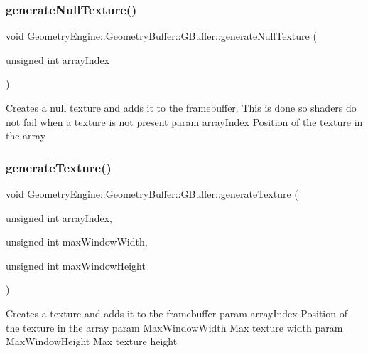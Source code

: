 \subsubsection{\texorpdfstring{generateNullTexture()}{generateNullTexture()}}
{\footnotesize\ttfamily void Geometry\+Engine\+::\+Geometry\+Buffer\+::\+G\+Buffer\+::generate\+Null\+Texture (\begin{DoxyParamCaption}\item[{unsigned int}]{array\+Index }\end{DoxyParamCaption})\hspace{0.3cm}{\ttfamily [protected]}}

Creates a null texture and adds it to the framebuffer. This is done so shaders do not fail when a texture is not present param array\+Index Position of the texture in the array \mbox{\label{class_geometry_engine_1_1_geometry_buffer_1_1_g_buffer_a6194e72290d3fe4eafa565f57befabb2}} 
\subsubsection{\texorpdfstring{generateTexture()}{generateTexture()}}
{\footnotesize\ttfamily void Geometry\+Engine\+::\+Geometry\+Buffer\+::\+G\+Buffer\+::generate\+Texture (\begin{DoxyParamCaption}\item[{unsigned int}]{array\+Index,  }\item[{unsigned int}]{max\+Window\+Width,  }\item[{unsigned int}]{max\+Window\+Height }\end{DoxyParamCaption})\hspace{0.3cm}{\ttfamily [protected]}}

Creates a texture and adds it to the framebuffer param array\+Index Position of the texture in the array param Max\+Window\+Width Max texture width param Max\+Window\+Height Max texture height \mbox{\label{class_geometry_engine_1_1_geometry_buffer_1_1_g_buffer_a47bda4849000d2728538de4e2f27f11a}} 
